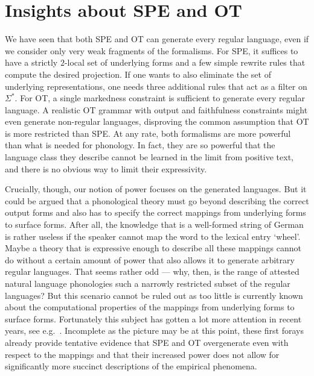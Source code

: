 \section{Insights about SPE and OT}
We have seen that both SPE and OT can generate every regular language, even if we consider only very weak fragments of the formalisms.
For SPE, it suffices to have a strictly $2$-local set of underlying forms and a few simple rewrite rules that compute the desired projection.
If one wants to also eliminate the set of underlying representations, one needs three additional rules that act as a filter on $\Sigma^*$.
For OT, a single markedness constraint is sufficient to generate every regular language.
A realistic OT grammar with output and faithfulness constraints might even generate non-regular languages, disproving the common assumption that OT is more restricted than SPE\@.
At any rate, both formalisms are more powerful than what is needed for phonology.
In fact, they are so powerful that the language class they describe cannot be learned in the limit from positive text, and there is no obvious way to limit their expressivity.

Crucially, though, our notion of power focuses on the generated languages.
But it could be argued that a phonological theory must go beyond describing the correct output forms and also has to specify the correct mappings from underlying forms to surface forms.
After all, the knowledge that \textipa{[Ra:t]} is a well-formed string of German is rather useless if the speaker cannot map the word to the lexical entry  `wheel'.
Maybe a theory that is expressive enough to describe all these mappings cannot do without a certain amount of power that also allows it to generate arbitrary regular languages.
That seems rather odd --- why, then, is the range of attested natural language phonologies such a narrowly restricted subset of the regular languages?
But this scenario cannot be ruled out as too little is currently known about the computational properties of the mappings from underlying forms to surface forms.
Fortunately this subject has gotten a lot more attention in recent years, see e.g.\ \citet{Chandlee14}.
Incomplete as the picture may be at this point, these first forays already provide tentative evidence that SPE and OT overgenerate even with respect to the mappings and that their increased power does not allow for significantly more succinct descriptions of the empirical phenomena.
